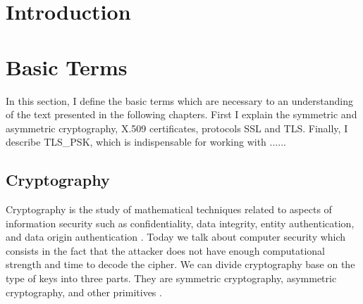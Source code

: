 \documentclass[
  digital, %
  notable,   %
  lof,     %
  lot,     %
]{fithesis3}
\begin{document}
\chapter{Introduction}


\chapter{Basic Terms}
In this section, I define the basic terms which are necessary to an understanding of the text 
presented in the following chapters. First I explain the symmetric and asymmetric cryptography, X.509 
certificates, protocols SSL and TLS. Finally, I describe TLS\_PSK, which is indispensable 
for working with ......

\section{Cryptography}
Cryptography is the study of mathematical techniques related to aspects of information
security such as confidentiality, data integrity, entity authentication, and data origin
authentication \cite{menezes1996handbook}. %
Today we talk about computer security which consists in the fact that the attacker does not have 
enough computational strength and time to decode the cipher. 
We can divide cryptography base on the type of keys into three parts. They are symmetric 
cryptography, asymmetric cryptography, and other primitives %
\cite{menezes1996handbook}%
.

\end{document}
